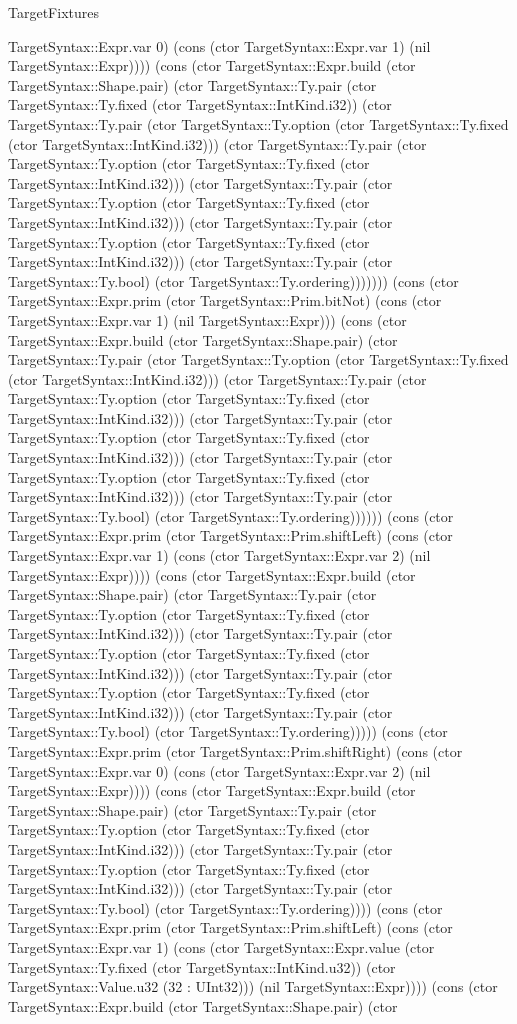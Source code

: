 \begin{lexlean}{TargetFixtures}
\begin{semanticmodule}
{TargetSyntax::Expr.var 0) (cons (ctor TargetSyntax::Expr.var 1) (nil TargetSyntax::Expr)))) (cons (ctor TargetSyntax::Expr.build (ctor TargetSyntax::Shape.pair) (ctor TargetSyntax::Ty.pair (ctor TargetSyntax::Ty.fixed (ctor TargetSyntax::IntKind.i32)) (ctor TargetSyntax::Ty.pair (ctor TargetSyntax::Ty.option (ctor TargetSyntax::Ty.fixed (ctor TargetSyntax::IntKind.i32))) (ctor TargetSyntax::Ty.pair (ctor TargetSyntax::Ty.option (ctor TargetSyntax::Ty.fixed (ctor TargetSyntax::IntKind.i32))) (ctor TargetSyntax::Ty.pair (ctor TargetSyntax::Ty.option (ctor TargetSyntax::Ty.fixed (ctor TargetSyntax::IntKind.i32))) (ctor TargetSyntax::Ty.pair (ctor TargetSyntax::Ty.option (ctor TargetSyntax::Ty.fixed (ctor TargetSyntax::IntKind.i32))) (ctor TargetSyntax::Ty.pair (ctor TargetSyntax::Ty.bool) (ctor TargetSyntax::Ty.ordering))))))) (cons (ctor TargetSyntax::Expr.prim (ctor TargetSyntax::Prim.bitNot) (cons (ctor TargetSyntax::Expr.var 1) (nil TargetSyntax::Expr))) (cons (ctor TargetSyntax::Expr.build (ctor TargetSyntax::Shape.pair) (ctor TargetSyntax::Ty.pair (ctor TargetSyntax::Ty.option (ctor TargetSyntax::Ty.fixed (ctor TargetSyntax::IntKind.i32))) (ctor TargetSyntax::Ty.pair (ctor TargetSyntax::Ty.option (ctor TargetSyntax::Ty.fixed (ctor TargetSyntax::IntKind.i32))) (ctor TargetSyntax::Ty.pair (ctor TargetSyntax::Ty.option (ctor TargetSyntax::Ty.fixed (ctor TargetSyntax::IntKind.i32))) (ctor TargetSyntax::Ty.pair (ctor TargetSyntax::Ty.option (ctor TargetSyntax::Ty.fixed (ctor TargetSyntax::IntKind.i32))) (ctor TargetSyntax::Ty.pair (ctor TargetSyntax::Ty.bool) (ctor TargetSyntax::Ty.ordering)))))) (cons (ctor TargetSyntax::Expr.prim (ctor TargetSyntax::Prim.shiftLeft) (cons (ctor TargetSyntax::Expr.var 1) (cons (ctor TargetSyntax::Expr.var 2) (nil TargetSyntax::Expr)))) (cons (ctor TargetSyntax::Expr.build (ctor TargetSyntax::Shape.pair) (ctor TargetSyntax::Ty.pair (ctor TargetSyntax::Ty.option (ctor TargetSyntax::Ty.fixed (ctor TargetSyntax::IntKind.i32))) (ctor TargetSyntax::Ty.pair (ctor TargetSyntax::Ty.option (ctor TargetSyntax::Ty.fixed (ctor TargetSyntax::IntKind.i32))) (ctor TargetSyntax::Ty.pair (ctor TargetSyntax::Ty.option (ctor TargetSyntax::Ty.fixed (ctor TargetSyntax::IntKind.i32))) (ctor TargetSyntax::Ty.pair (ctor TargetSyntax::Ty.bool) (ctor TargetSyntax::Ty.ordering))))) (cons (ctor TargetSyntax::Expr.prim (ctor TargetSyntax::Prim.shiftRight) (cons (ctor TargetSyntax::Expr.var 0) (cons (ctor TargetSyntax::Expr.var 2) (nil TargetSyntax::Expr)))) (cons (ctor TargetSyntax::Expr.build (ctor TargetSyntax::Shape.pair) (ctor TargetSyntax::Ty.pair (ctor TargetSyntax::Ty.option (ctor TargetSyntax::Ty.fixed (ctor TargetSyntax::IntKind.i32))) (ctor TargetSyntax::Ty.pair (ctor TargetSyntax::Ty.option (ctor TargetSyntax::Ty.fixed (ctor TargetSyntax::IntKind.i32))) (ctor TargetSyntax::Ty.pair (ctor TargetSyntax::Ty.bool) (ctor TargetSyntax::Ty.ordering)))) (cons (ctor TargetSyntax::Expr.prim (ctor TargetSyntax::Prim.shiftLeft) (cons (ctor TargetSyntax::Expr.var 1) (cons (ctor TargetSyntax::Expr.value (ctor TargetSyntax::Ty.fixed (ctor TargetSyntax::IntKind.u32)) (ctor TargetSyntax::Value.u32 (32 : UInt32))) (nil TargetSyntax::Expr)))) (cons (ctor TargetSyntax::Expr.build (ctor TargetSyntax::Shape.pair) (ctor }
\end{semanticmodule}
\end{lexlean}

